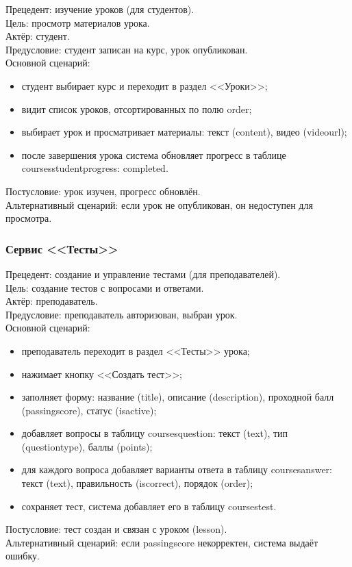{Прецедент: изучение уроков (для студентов)}. \\
{Цель}: просмотр материалов урока. \\
{Актёр}: студент. \\
{Предусловие}: студент записан на курс, урок опубликован. \\
{Основной сценарий}:
\begin{itemize}
	\item студент выбирает курс и переходит в раздел <<Уроки>>;
	\item видит список уроков, отсортированных по полю order;
	\item выбирает урок и просматривает материалы: текст (content), видео (videourl);
	\item после завершения урока система обновляет прогресс в таблице coursesstudentprogress: completed.
\end{itemize}
{Постусловие}: урок изучен, прогресс обновлён. \\
{Альтернативный сценарий}: если урок не опубликован, он недоступен для просмотра.

\subsubsection{Сервис <<Тесты>>}

{Прецедент: создание и управление тестами (для преподавателей)}. \\
{Цель}: создание тестов с вопросами и ответами. \\
{Актёр}: преподаватель. \\
{Предусловие}: преподаватель авторизован, выбран урок. \\
{Основной сценарий}:
\begin{itemize}
	\item преподаватель переходит в раздел <<Тесты>> урока;
	\item нажимает кнопку <<Создать тест>>;
	\item заполняет форму: название (title), описание (description), проходной балл (passingscore), статус (isactive);
	\item добавляет вопросы в таблицу coursesquestion: текст (text), тип (questiontype), баллы (points);
	\item для каждого вопроса добавляет варианты ответа в таблицу coursesanswer: текст (text), правильность (iscorrect), порядок (order);
	\item сохраняет тест, система добавляет его в таблицу coursestest.
\end{itemize}
{Постусловие}: тест создан и связан с уроком (lesson). \\
{Альтернативный сценарий}: если passingscore некорректен, система выдаёт ошибку.

